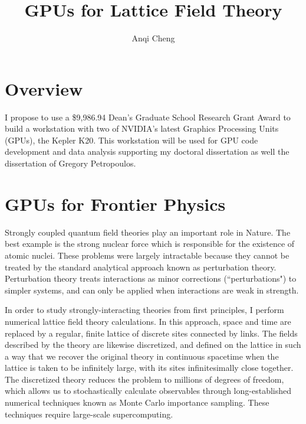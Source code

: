 \documentclass[11pt]{article}
\begin{document}
  \title{GPUs for Lattice Field Theory}
  \author{Anqi Cheng}
  \maketitle

  \section*{Overview} %
 I propose to use a \$9,986.94 Dean's Graduate School Research Grant Award to build a workstation with two of NVIDIA's latest Graphics Processing Units (GPUs), the Kepler K20.
  This workstation will be used for GPU code development and data analysis supporting my doctoral dissertation as well the dissertation of Gregory Petropoulos.\\
  
  \section*{GPUs for Frontier Physics}
  Strongly coupled quantum field theories play an important role in Nature.
  The best example is the strong nuclear force which is responsible for the existence of atomic nuclei.
  These problems were largely intractable because they cannot be treated by the standard analytical approach known as perturbation theory.
  Perturbation theory treats interactions as minor corrections (``perturbations") to simpler systems, and can only be applied when interactions are weak in strength.

  In order to study strongly-interacting theories from first principles, I perform numerical lattice field theory calculations.
  In this approach, space and time are replaced by a regular, finite lattice of discrete sites connected by links.
  The fields described by the theory are likewise discretized, and defined on the lattice in such a way that we recover the original theory in continuous spacetime when the lattice is taken to be infinitely large, with its sites infinitesimally close together.
  The discretized theory reduces the problem to millions of degrees of freedom, which allows us to stochastically calculate observables through long-established numerical techniques known as Monte Carlo importance sampling.
  These techniques require large-scale supercomputing.
\end{document}
